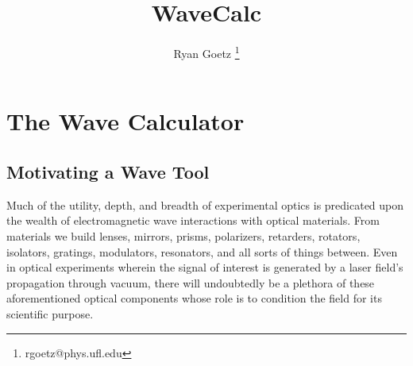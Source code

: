 \documentclass[11pt, reqno]{book}%
\title{WaveCalc}
\author{Ryan Goetz \thanks{rgoetz@phys.ufl.edu}}
\newcounter{ct}
\begin{document}
\maketitle

\rhead[\today]{\today}


\tableofcontents




\chapter{The Wave Calculator}
\label{chap:intro}

\section{Motivating a Wave Tool}
\label{sec:motivation}

Much of the utility, depth, and breadth of experimental optics is predicated upon the wealth of electromagnetic wave interactions with optical materials. From materials we build lenses, mirrors, prisms, polarizers, retarders, rotators, isolators, gratings, modulators, resonators, and all sorts of things between. Even in optical experiments wherein the signal of interest is generated by a laser field's propagation through vacuum, there will undoubtedly be a plethora of these aforementioned optical components whose role is to condition the field for its scientific purpose.
\end{document}
